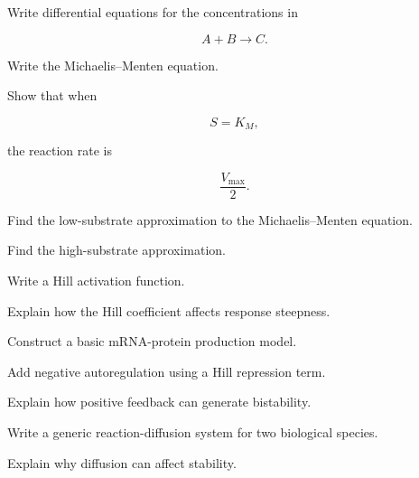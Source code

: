 \begin{exercise}[3]
Write differential equations for the concentrations in

\[
A+B\to C.
\]
\end{exercise}

\begin{exercise}[2]
Write the Michaelis--Menten equation.
\end{exercise}

\begin{exercise}[2]
Show that when

\[
S=K_M,
\]

the reaction rate is

\[
\frac{V_{\max}}{2}.
\]
\end{exercise}

\begin{exercise}[3]
Find the low-substrate approximation to the Michaelis--Menten equation.
\end{exercise}

\begin{exercise}[3]
Find the high-substrate approximation.
\end{exercise}

\begin{exercise}[2]
Write a Hill activation function.
\end{exercise}

\begin{exercise}[3]
Explain how the Hill coefficient affects response steepness.
\end{exercise}

\begin{exercise}[3]
Construct a basic mRNA-protein production model.
\end{exercise}

\begin{exercise}[3]
Add negative autoregulation using a Hill repression term.
\end{exercise}

\begin{exercise}[3]
Explain how positive feedback can generate bistability.
\end{exercise}

\begin{exercise}[2]
Write a generic reaction-diffusion system for two biological species.
\end{exercise}

\begin{exercise}[3]
Explain why diffusion can affect stability.
\end{exercise}

